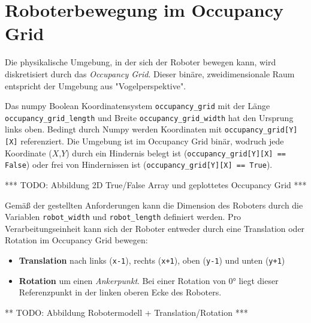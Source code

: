 \chapter{Roboterbewegung im Occupancy Grid}

Die physikalische Umgebung, in der sich der Roboter bewegen kann, wird diskretisiert durch das \textit{Occupancy Grid}.
Dieser binäre, zweidimensionale Raum entspricht der Umgebung aus "Vogelperspektive". 

Das numpy Boolean Koordinatensystem \texttt{occupancy\_grid} mit der Länge \texttt{occupancy\_grid\_length} und Breite \texttt{occupancy\_grid\_width} hat den Ursprung links oben. Bedingt durch Numpy werden Koordinaten mit \texttt{occupancy\_grid[Y][X]} referenziert. Die Umgebung ist im Occupancy Grid binär, wodruch jede Koordinate ($X$,$Y$) durch ein Hindernis belegt ist (\texttt{occupancy\_grid[Y][X] == False}) oder frei von Hindernissen ist (\texttt{occupancy\_grid[Y][X] == True}).

*** TODO: Abbildung 2D True/False Array und geplottetes Occupancy Grid ***

Gemäß der gestellten Anforderungen kann die Dimension des Roboters durch die Variablen \texttt{robot\_width} und \texttt{robot\_length} definiert werden. Pro Verarbeitungseinheit kann sich der Roboter entweder durch eine Translation oder Rotation im Occupancy Grid bewegen:
\begin{itemize}
\item \textbf{Translation} nach links (\texttt{x-1}), rechts (\texttt{x+1}), oben (\texttt{y-1}) und unten (\texttt{y+1})
\item \textbf{Rotation} um einen \textit{Ankerpunkt}. Bei einer Rotation von $0°$ liegt dieser Referenzpunkt in der linken oberen Ecke des Roboters.
\end{itemize}

** TODO: Abbildung Robotermodell + Translation/Rotation ***
